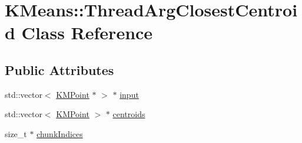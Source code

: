\hypertarget{classKMeans_1_1ThreadArgClosestCentroid}{\section{K\-Means\-:\-:Thread\-Arg\-Closest\-Centroid Class Reference}
\label{classKMeans_1_1ThreadArgClosestCentroid}
}
\subsection*{Public Attributes}
\begin{DoxyCompactItemize}
\item 
std\-::vector$<$ \hyperlink{structKMeans_1_1KMPoint}{K\-M\-Point} $\ast$ $>$ $\ast$ \hyperlink{classKMeans_1_1ThreadArgClosestCentroid_ab5aa69fc9a81c813c6a4836679e698f8}{input}
\item 
std\-::vector$<$ \hyperlink{structKMeans_1_1KMPoint}{K\-M\-Point} $>$ $\ast$ \hyperlink{classKMeans_1_1ThreadArgClosestCentroid_a3430e65d878b25d8b96a7e663be62e82}{centroids}
\item 
size\-\_\-t $\ast$ \hyperlink{classKMeans_1_1ThreadArgClosestCentroid_a84cc9890531db34f34e5c008c55a6d0a}{chunk\-Indices}
\end{DoxyCompactItemize}


